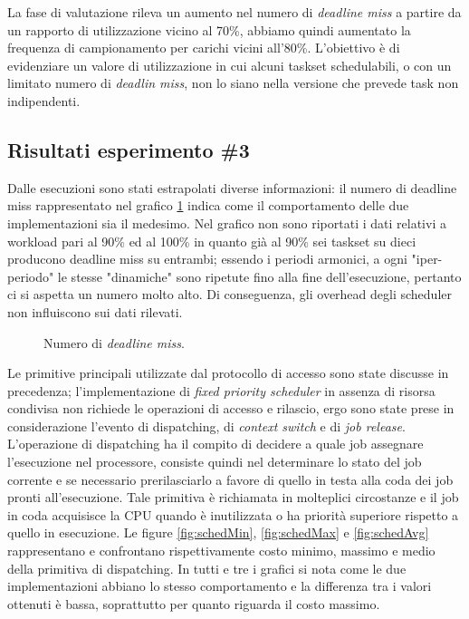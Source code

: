 La fase di valutazione rileva un aumento nel numero di \textit{deadline miss} a partire da un rapporto di utilizzazione vicino al 70\%, abbiamo quindi aumentato la frequenza di campionamento per carichi vicini all'80\%. L'obiettivo è di evidenziare un valore di utilizzazione in cui alcuni taskset schedulabili, o con un limitato numero di \textit{deadlin miss}, non lo siano nella versione che prevede task non indipendenti.

\subsection{Risultati esperimento \#3}
\label{sec:confronto_norisorsa_ris}

Dalle esecuzioni sono stati estrapolati diverse informazioni: il numero di deadline miss rappresentato nel grafico \ref{fig:DLM} indica come il comportamento delle due implementazioni sia il medesimo. Nel grafico non sono riportati i dati relativi a workload pari al 90\% ed al 100\% in quanto già al 90\% sei taskset su dieci producono deadline miss su entrambi; essendo i periodi armonici, a ogni "iper-periodo" le stesse "dinamiche" sono ripetute fino alla fine dell'esecuzione, pertanto ci si aspetta un numero molto alto. Di conseguenza, gli overhead degli scheduler non influiscono sui dati rilevati.\\

  \begin{figure}
    \graficoUno
    \caption{Numero di \textit{deadline miss}.} %
    \label{fig:DLM}
  \end{figure}

Le primitive principali utilizzate dal protocollo di accesso sono state discusse in precedenza; l'implementazione di \textit{fixed priority scheduler} in assenza di risorsa condivisa non richiede le operazioni di accesso e rilascio, ergo sono state prese in considerazione l'evento di dispatching, di \textit{context switch} e di \textit{job release}.\\

L'operazione di dispatching ha il compito di decidere a quale job assegnare l'esecuzione nel processore, consiste quindi nel determinare lo stato del job corrente e se necessario prerilasciarlo a favore di quello in testa alla coda dei job pronti all'esecuzione. Tale primitiva è richiamata in molteplici circostanze e il job in coda acquisisce la CPU quando è inutilizzata o ha priorità superiore rispetto a quello in esecuzione. Le figure \ref{fig:schedMin}, \ref{fig:schedMax} e \ref{fig:schedAvg} rappresentano e confrontano rispettivamente costo minimo, massimo e medio della primitiva di dispatching. In tutti e tre i grafici si nota come le due implementazioni abbiano lo stesso comportamento e la differenza tra i valori ottenuti è bassa, soprattutto per quanto riguarda il costo massimo.\\

